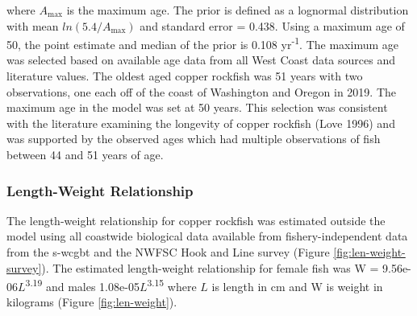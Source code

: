\documentclass[11pt,
  english,
  a4paper,
]{article}
\begin{document}
\vspace{0.5cm}


where {\(A_{\text{max}}\)\leavevmode\tagmcend\tagstructend} is the maximum age. The prior is defined as a lognormal distribution with mean {\(ln(5.4/A_{\text{max}})\)\leavevmode\tagmcend\tagstructend} and standard error = 0.438. Using a maximum age of 50, the point estimate and median of the prior is 0.108 yr\textsuperscript{-1}. The maximum age was selected based on available age data from all West Coast data sources and literature values. The oldest aged copper rockfish was 51 years with two observations, one each off of the coast of Washington and Oregon in 2019. The maximum age in the model was set at 50 years. This selection was consistent with the literature examining the longevity of copper rockfish {(Love 1996)\leavevmode\tagmcend\tagstructend} and was supported by the observed ages which had multiple observations of fish between 44 and 51 years of age.

\leavevmode\tagmcend\tagstructend\par


\hypertarget{length-weight-relationship}{%
\subsubsection{Length-Weight Relationship}\label{length-weight-relationship}}

\leavevmode\tagmcend\tagstructend


The length-weight relationship for copper rockfish was estimated outside the model using all coastwide biological data available from fishery-independent data from the \gls{s-wcgbt} and the NWFSC Hook and Line survey (Figure \ref{fig:len-weight-survey}). The estimated length-weight relationship for female fish was W = 9.56e-06{\(L\)\leavevmode\tagmcend\tagstructend}\textsuperscript{3.19} and males 1.08e-05{\(L\)\leavevmode\tagmcend\tagstructend}\textsuperscript{3.15} where {\(L\)\leavevmode\tagmcend\tagstructend} is length in cm and W is weight in kilograms (Figure \ref{fig:len-weight}).
\end{document}
